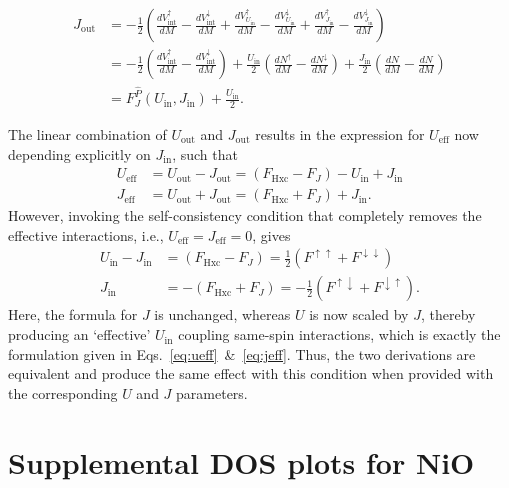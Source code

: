 %
\begin{align}
J_\textrm{out}&
=-\frac{1}{2}\left(\frac{dV_\textrm{int}^\uparrow}{dM}-\frac{dV_\textrm{int}^\downarrow}{dM}
+\frac{dV_{U_\textrm{in}}^\uparrow}{dM}-\frac{dV_{U_\textrm{in}}^\downarrow}{dM}
+\frac{dV_{J_\textrm{in}}^\uparrow}{dM}-\frac{dV_{J_\textrm{in}}^\downarrow}{dM}\right)
\nonumber \\[10pt]
&=-\frac{1}{2}\left(\frac{dV_\textrm{int}^\uparrow}{dM}-\frac{dV_\textrm{int}^\downarrow}{dM}\right)
+\frac{U_\textrm{in}}{2}\left(\frac{dN^\uparrow}{dM}-\frac{dN^\downarrow}{dM}\right)
+\frac{J_\textrm{in}}{2}\left(\frac{dN}{dM}-\frac{dN}{dM}\right)
\nonumber \\[10pt]
&=F_J^{\hat{P}}(U_\textrm{in},J_\textrm{in})+\frac{U_\textrm{in}}{2}. 
\label{eq:j_self_consistent_interaction3}
\end{align}

The linear combination 
of $U_\textrm{out}$ and $J_\textrm{out}$ 
results in the expression for $U_\textrm{eff}$ 
now depending explicitly on $J_\textrm{in}$, 
such that 
%
\begin{align}
U_\textrm{eff}&=U_\textrm{out}-J_\textrm{out} = \left(F_\textrm{Hxc}-F_J\right)-U_\textrm{in}+J_\textrm{in}\nonumber \\
J_\textrm{eff}&=U_\textrm{out}+J_\textrm{out} = \left(F_\textrm{Hxc}+F_J\right)+J_\textrm{in}.
\label{eq:uoutjout2}
\end{align}
%
However, 
invoking the self-consistency condition 
that completely removes the effective interactions, 
i.e., $U_\textrm{eff}=J_\textrm{eff}=0$, gives 
%
\begin{align}
U_\textrm{in}-J_\textrm{in} &= \left(F_\textrm{Hxc}-F_J\right)=\frac{1}{2}\left(F^{\uparrow\uparrow}+F^{\downarrow\downarrow}\right)\nonumber \\[10pt]
J_\textrm{in} &= -\left(F_\textrm{Hxc}+F_J\right)=-\frac{1}{2}\left(F^{\uparrow\downarrow}+F^{\downarrow\uparrow}\right).
\label{eq:ueffjeff2}
\end{align}
%
Here, the formula for $J$ is unchanged, 
whereas $U$ is now scaled by $J$, 
thereby producing an `effective' $U_\textrm{in}$ 
coupling same-spin interactions, 
which is exactly the formulation 
given in Eqs.~\eqref{eq:ueff}~\&~\eqref{eq:jeff}. 
%
Thus, the two derivations are equivalent 
and produce the same effect 
with this condition when provided 
with the corresponding $U$ and $J$ parameters.
\newpage


\section{Supplemental DOS plots for NiO}


